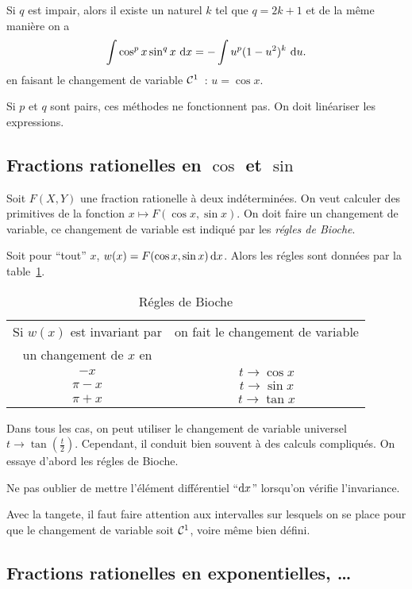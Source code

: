 Si $q$ est impair, alors il existe un naturel $k$ tel que $q=2k+1$ et de la même manière on a
\begin{equation}
  \int \cos^p x \sin^q x\,\mathop{}\mathopen{}\mathrm{d} x = -\int u^p(1-u^2)^k \,\mathop{}\mathopen{}\mathrm{d} u.
\end{equation}
en faisant le changement de variable $\mathcal{C}^{1}$~: $u=\cos x$.

Si $p$ et $q$ sont pairs, ces méthodes ne fonctionnent pas. On doit linéariser les expressions.

\subsection{Fractions rationelles en $\cos$ et $\sin$}

Soit $F(X,Y)$ une fraction rationelle à deux indéterminées. On veut calculer des primitives de la fonction $x \longmapsto F(\cos x,\sin x)$. On doit faire un changement de variable, ce changement de variable est indiqué par les \emph{régles de Bioche}.

Soit pour ``tout'' $x$, $w(x)=F(\cos x,\sin x)\mathop{}\mathopen{}\mathrm{d} x$. Alors les régles sont données par la table~\ref{tab:bioche}.
\begin{table}[!h]
  \centering
  \begin{tabular}{|c|c|}\hline
    Si $w(x)$ est invariant par & on fait le changement de variable \\
    un changement de $x$ en &  \\ \hline
    $-x$ & $t \to \cos x$\\
    $\pi-x$ & $t \to \sin x$\\
    $\pi+x$ & $t \to \tan x$\\
  \hline\end{tabular}
  \caption{Régles de Bioche}
  \label{tab:bioche}
\end{table}

Dans tous les cas, on peut utiliser le changement de variable universel $t \to \tan\left(\frac{t}{2}\right)$. Cependant, il conduit bien souvent à des calculs compliqués. On essaye d'abord les régles de Bioche.

\danger Ne pas oublier de mettre l'élément différentiel ``$\mathop{}\mathopen{}\mathrm{d} x$'' lorsqu'on vérifie l'invariance.

\danger Avec la tangete, il faut faire attention aux intervalles sur lesquels on se place pour que le changement de variable soit $\mathcal{C}^{1}$, voire même bien défini.

\subsection{Fractions rationelles en exponentielles, \ldots}

